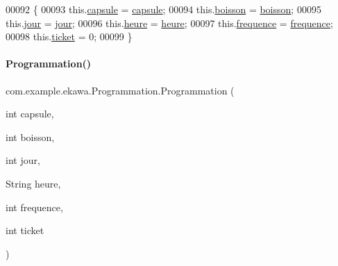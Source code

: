 \begin{DoxyCode}
00092     \{
00093         this.\hyperlink{classcom_1_1example_1_1ekawa_1_1_programmation_a97573a66f9b2821a7445c69f346a5298}{capsule} = \hyperlink{classcom_1_1example_1_1ekawa_1_1_programmation_a97573a66f9b2821a7445c69f346a5298}{capsule};
00094         this.\hyperlink{classcom_1_1example_1_1ekawa_1_1_programmation_a625a85ed4d0b16f52382fd458e0e5657}{boisson} = \hyperlink{classcom_1_1example_1_1ekawa_1_1_programmation_a625a85ed4d0b16f52382fd458e0e5657}{boisson};
00095         this.\hyperlink{classcom_1_1example_1_1ekawa_1_1_programmation_a96605063cb4177fa382b1ce2388f544f}{jour} = \hyperlink{classcom_1_1example_1_1ekawa_1_1_programmation_a96605063cb4177fa382b1ce2388f544f}{jour};
00096         this.\hyperlink{classcom_1_1example_1_1ekawa_1_1_programmation_abfff674f6cd5f76ea4b8c37e8c558ffa}{heure} = \hyperlink{classcom_1_1example_1_1ekawa_1_1_programmation_abfff674f6cd5f76ea4b8c37e8c558ffa}{heure};
00097         this.\hyperlink{classcom_1_1example_1_1ekawa_1_1_programmation_a6d0fd682b51727025ed8c4bf35fc8980}{frequence} = \hyperlink{classcom_1_1example_1_1ekawa_1_1_programmation_a6d0fd682b51727025ed8c4bf35fc8980}{frequence};
00098         this.\hyperlink{classcom_1_1example_1_1ekawa_1_1_programmation_a54ce49550025f7f5e5080f0548b08653}{ticket} = 0;
00099     \}
\end{DoxyCode}
\mbox{\label{classcom_1_1example_1_1ekawa_1_1_programmation_a06d8594e85da1735683f35228e7e6f8d}} 
\paragraph{\texorpdfstring{Programmation()}{Programmation()}\hspace{0.1cm}{\footnotesize\ttfamily [2/2]}}
{\footnotesize\ttfamily com.\+example.\+ekawa.\+Programmation.\+Programmation (\begin{DoxyParamCaption}\item[{int}]{capsule,  }\item[{int}]{boisson,  }\item[{int}]{jour,  }\item[{String}]{heure,  }\item[{int}]{frequence,  }\item[{int}]{ticket }\end{DoxyParamCaption})}



